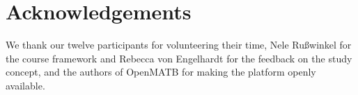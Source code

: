 \documentclass[10pt,twocolumn]{article}
\begin{document}
\section*{Acknowledgements}
We thank our twelve participants for volunteering their time, Nele Ru{\ss}winkel for the course framework and Rebecca von Engelhardt for the feedback on the study concept, and the authors of OpenMATB \parencite{Cegarra2020} for making the platform openly available.

\printbibliography
\end{document}

